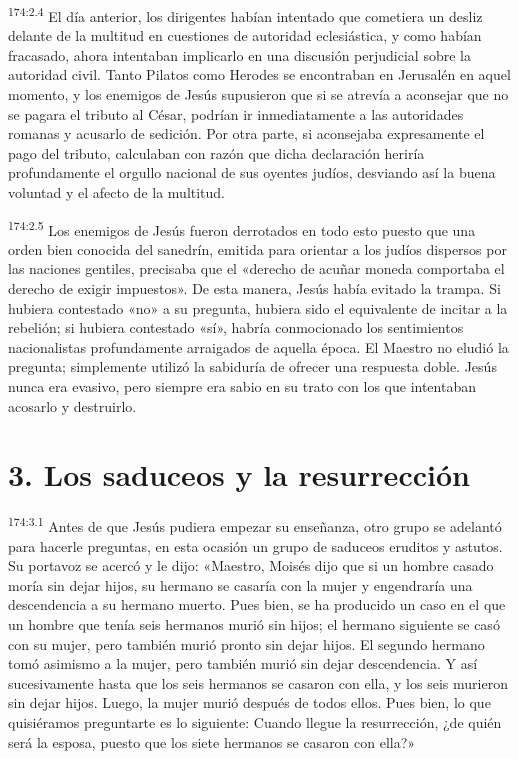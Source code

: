 \par 
\textsuperscript{174:2.4} El día anterior, los dirigentes habían intentado que cometiera un desliz delante de la multitud en cuestiones de autoridad eclesiástica, y como habían fracasado, ahora intentaban implicarlo en una discusión perjudicial sobre la autoridad civil. Tanto Pilatos como Herodes se encontraban en Jerusalén en aquel momento, y los enemigos de Jesús supusieron que si se atrevía a aconsejar que no se pagara el tributo al César, podrían ir inmediatamente a las autoridades romanas y acusarlo de sedición. Por otra parte, si aconsejaba expresamente el pago del tributo, calculaban con razón que dicha declaración heriría profundamente el orgullo nacional de sus oyentes judíos, desviando así la buena voluntad y el afecto de la multitud.

\par 
\textsuperscript{174:2.5} Los enemigos de Jesús fueron derrotados en todo esto puesto que una orden bien conocida del sanedrín, emitida para orientar a los judíos dispersos por las naciones gentiles, precisaba que el «derecho de acuñar moneda comportaba el derecho de exigir impuestos». De esta manera, Jesús había evitado la trampa. Si hubiera contestado «no» a su pregunta, hubiera sido el equivalente de incitar a la rebelión; si hubiera contestado «sí», habría conmocionado los sentimientos nacionalistas profundamente arraigados de aquella época. El Maestro no eludió la pregunta; simplemente utilizó la sabiduría de ofrecer una respuesta doble. Jesús nunca era evasivo, pero siempre era sabio en su trato con los que intentaban acosarlo y destruirlo.

\section*{3. Los saduceos y la resurrección}
\par 
\textsuperscript{174:3.1} Antes de que Jesús pudiera empezar su enseñanza, otro grupo se adelantó para hacerle preguntas, en esta ocasión un grupo de saduceos eruditos y astutos. Su portavoz se acercó y le dijo: «Maestro, Moisés dijo que si un hombre casado moría sin dejar hijos, su hermano se casaría con la mujer y engendraría una descendencia a su hermano muerto. Pues bien, se ha producido un caso en el que un hombre que tenía seis hermanos murió sin hijos; el hermano siguiente se casó con su mujer, pero también murió pronto sin dejar hijos. El segundo hermano tomó asimismo a la mujer, pero también murió sin dejar descendencia. Y así sucesivamente hasta que los seis hermanos se casaron con ella, y los seis murieron sin dejar hijos. Luego, la mujer murió después de todos ellos. Pues bien, lo que quisiéramos preguntarte es lo siguiente: Cuando llegue la resurrección, ¿de quién será la esposa, puesto que los siete hermanos se casaron con ella?»

